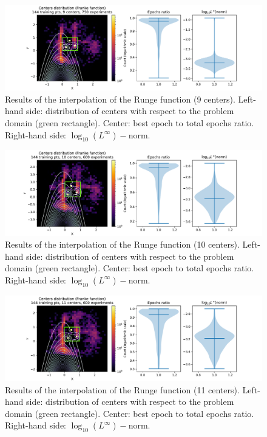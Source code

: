 \documentclass[12pt]{report} %
\begin{document}
\begin{figure}[H]
  \includegraphics[width=\textwidth, trim={2cm 0 2.8cm 0}, clip=true]{imagenes/experiments/2d/franke_interpolation/tr12_c9_franke.pdf}
  \caption{Results of the interpolation of the Runge function (9 centers). 
  Left-hand side: distribution of centers with respect to the problem domain (green rectangle). Center: best epoch to total epochs ratio.
  Right-hand side: $\log_{10}(L^\infty)-$norm.}
  \label{fig:franke-tr12-c9}
\end{figure}
\begin{figure}[H]
  \includegraphics[width=\textwidth, trim={2cm 0 2.8cm 0}, clip=true]{imagenes/experiments/2d/franke_interpolation/tr12_c10_franke.pdf}
  \caption{Results of the interpolation of the Runge function (10 centers). 
  Left-hand side: distribution of centers with respect to the problem domain (green rectangle). Center: best epoch to total epochs ratio.
  Right-hand side: $\log_{10}(L^\infty)-$norm.}
  \label{fig:franke-tr12-c10}
\end{figure}
\begin{figure}[H]
  \includegraphics[width=\textwidth, trim={2cm 0 2.8cm 0}, clip=true]{imagenes/experiments/2d/franke_interpolation/tr12_c11_franke.pdf}
  \caption{Results of the interpolation of the Runge function (11 centers). 
  Left-hand side: distribution of centers with respect to the problem domain (green rectangle). Center: best epoch to total epochs ratio.
  Right-hand side: $\log_{10}(L^\infty)-$norm.}
  \label{fig:franke-tr12-c11}
\end{figure}
\end{document}
